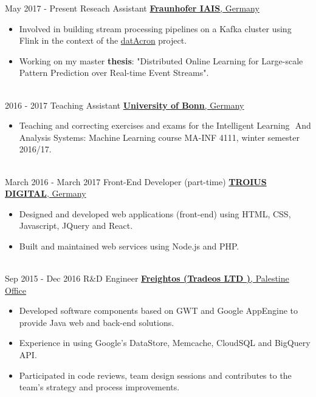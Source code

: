 \documentclass[letterpaper]{twentysecondcv} %
\begin{document}
\begin{twenty} %
	
	\twentyitem
	{May 2017 -}
	{Present}
	{Reseach Assistant}
	{\href{https://www.iais.fraunhofer.de/?L=1}{\large\textbf{Fraunhofer IAIS}, Germany}}
	{}
	{\begin{itemize}
			\item Involved in building stream processing pipelines on a Kafka cluster using Flink in the context of the \href{http://www.datacron-project.eu/}{datAcron} project.
			
			\item Working on my master \textbf{thesis}: "Distributed Online Learning for Large-scale Pattern Prediction over Real-time Event Streams".
	\end{itemize}}
\\
		\twentyitem
	{2016 - 2017}
	{}
	{Teaching Assistant}
	{\href{https://www.kdml.iai.uni-bonn.de/teaching/winter-2016-17}{\large\textbf{University of Bonn}, Germany}}
	{}
	 {\begin{itemize}
			\item Teaching and correcting exercises and exams for the Intelligent Learning ​ And Analysis Systems: Machine Learning course  MA-INF 4111, winter semester 2016/17.
	\end{itemize}}


        \\
	\twentyitem
    	{March 2016 -}
		{March 2017}
        {Front-End Developer (part-time)}
        {\href{https://twitter.com/TROIUS_DIGITAL}{\large\textbf{TROIUS DIGITAL}, Germany}}
        {}
        {
        {\begin{itemize}
        \item Designed and developed web applications (front-end) using HTML, CSS, Javascript, JQuery and React.
        \item Built and maintained web services using Node.js and PHP.
    \end{itemize}}
        }
    \\   
    \twentyitem
   		{Sep 2015 -}
		{Dec 2016}
        {R\&D Engineer}
        {\href{https://www.freightos.com/}{\large\textbf{Freightos (Tradeos LTD )}, Palestine Office}}
        {}
        {
        {\begin{itemize}
        \item Developed software components based on  GWT and Google AppEngine to provide Java web and back-end solutions.
        \item Experience in using Google's DataStore, Memcache, CloudSQL and BigQuery API.
        \item Participated in code reviews, team design sessions and contributes to the team’s strategy and process improvements.
        

\end{itemize}}}
\end{twenty}
\end{document}
